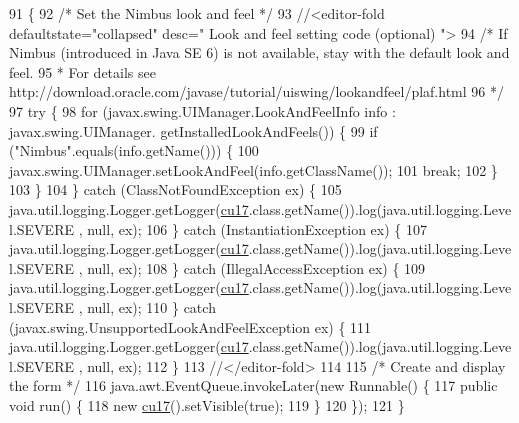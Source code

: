 \begin{DoxyCode}
91                                            \{
92         \textcolor{comment}{/* Set the Nimbus look and feel */}
93         \textcolor{comment}{//<editor-fold defaultstate="collapsed" desc=" Look and feel setting code (optional) ">}
94         \textcolor{comment}{/* If Nimbus (introduced in Java SE 6) is not available, stay with the default look and feel.}
95 \textcolor{comment}{         * For details see http://download.oracle.com/javase/tutorial/uiswing/lookandfeel/plaf.html }
96 \textcolor{comment}{         */}
97         \textcolor{keywordflow}{try} \{
98             \textcolor{keywordflow}{for} (javax.swing.UIManager.LookAndFeelInfo info : javax.swing.UIManager.
      getInstalledLookAndFeels()) \{
99                 \textcolor{keywordflow}{if} (\textcolor{stringliteral}{"Nimbus"}.equals(info.getName())) \{
100                     javax.swing.UIManager.setLookAndFeel(info.getClassName());
101                     \textcolor{keywordflow}{break};
102                 \}
103             \}
104         \} \textcolor{keywordflow}{catch} (ClassNotFoundException ex) \{
105             java.util.logging.Logger.getLogger(\mbox{\hyperlink{classinterfacessoguar_1_1cu17_a6cfceedd011127f9629cc5a686dbe81a}{cu17}}.class.getName()).log(java.util.logging.Level.SEVERE
      , null, ex);
106         \} \textcolor{keywordflow}{catch} (InstantiationException ex) \{
107             java.util.logging.Logger.getLogger(\mbox{\hyperlink{classinterfacessoguar_1_1cu17_a6cfceedd011127f9629cc5a686dbe81a}{cu17}}.class.getName()).log(java.util.logging.Level.SEVERE
      , null, ex);
108         \} \textcolor{keywordflow}{catch} (IllegalAccessException ex) \{
109             java.util.logging.Logger.getLogger(\mbox{\hyperlink{classinterfacessoguar_1_1cu17_a6cfceedd011127f9629cc5a686dbe81a}{cu17}}.class.getName()).log(java.util.logging.Level.SEVERE
      , null, ex);
110         \} \textcolor{keywordflow}{catch} (javax.swing.UnsupportedLookAndFeelException ex) \{
111             java.util.logging.Logger.getLogger(\mbox{\hyperlink{classinterfacessoguar_1_1cu17_a6cfceedd011127f9629cc5a686dbe81a}{cu17}}.class.getName()).log(java.util.logging.Level.SEVERE
      , null, ex);
112         \}
113         \textcolor{comment}{//</editor-fold>}
114 
115         \textcolor{comment}{/* Create and display the form */}
116         java.awt.EventQueue.invokeLater(\textcolor{keyword}{new} Runnable() \{
117             \textcolor{keyword}{public} \textcolor{keywordtype}{void} run() \{
118                 \textcolor{keyword}{new} \mbox{\hyperlink{classinterfacessoguar_1_1cu17_a6cfceedd011127f9629cc5a686dbe81a}{cu17}}().setVisible(\textcolor{keyword}{true});
119             \}
120         \});
121     \}
\end{DoxyCode}


